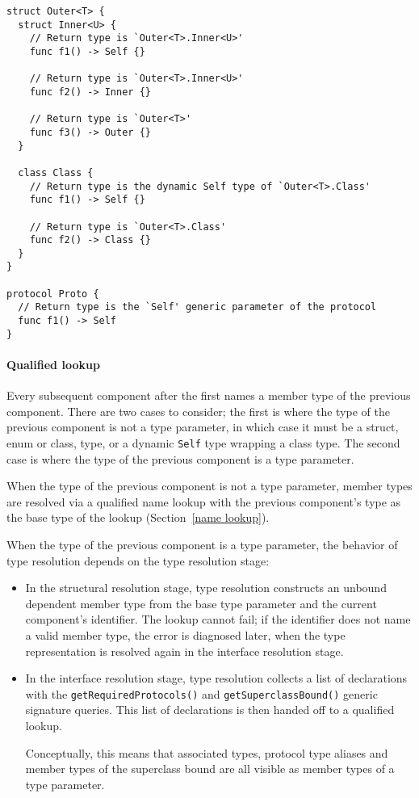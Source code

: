 \documentclass[../generics]{subfiles}
\begin{document}
\begin{listing}\label{type resolution unqualified}
\begin{Verbatim}
struct Outer<T> {
  struct Inner<U> {
    // Return type is `Outer<T>.Inner<U>'
    func f1() -> Self {}

    // Return type is `Outer<T>.Inner<U>'
    func f2() -> Inner {}

    // Return type is `Outer<T>'
    func f3() -> Outer {} 
  }
  
  class Class {
    // Return type is the dynamic Self type of `Outer<T>.Class'
    func f1() -> Self {}
    
    // Return type is `Outer<T>.Class'
    func f2() -> Class {}
  }
}

protocol Proto {
  // Return type is the `Self' generic parameter of the protocol
  func f1() -> Self
}
\end{Verbatim}
\end{listing}

\paragraph{Qualified lookup} Every subsequent component after the first names a member type of the previous component. There are two cases to consider; the first is where the type of the previous component is not a type parameter, in which case it must be a struct, enum or class, type, or a dynamic \texttt{Self} type wrapping a class type. The second case is where the type of the previous component is a type parameter.

When the type of the previous component is not a type parameter, member types are resolved via a qualified name lookup with the previous component's type as the base type of the lookup (Section~\ref{name lookup}).

When the type of the previous component is a type parameter, the behavior of type resolution depends on the type resolution stage:
\begin{itemize}
\item In the structural resolution stage, type resolution constructs an unbound dependent member type from the base type parameter and the current component's identifier. The lookup cannot fail; if the identifier does not name a valid member type, the error is diagnosed later, when the type representation is resolved again in the interface resolution stage.
\item In the interface resolution stage, type resolution collects a list of declarations with the \texttt{getRequiredProtocols()} and \texttt{getSuperclassBound()} generic signature queries. This list of declarations is then handed off to a qualified lookup.

Conceptually, this means that associated types, protocol type aliases and member types of the superclass bound are all visible as member types of a type parameter.
\end{itemize}
\end{document}
